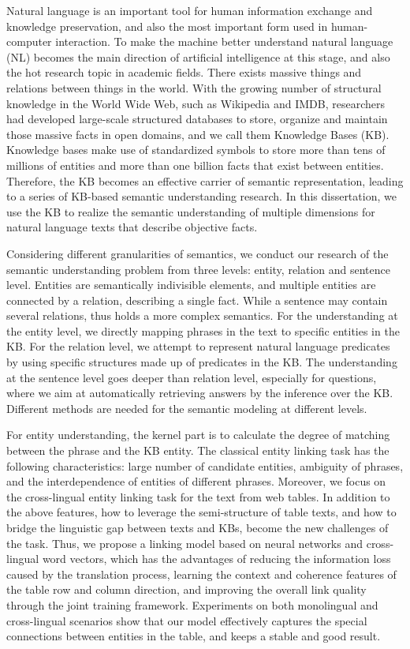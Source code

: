 \begin{englishabstract}

Natural language is an important tool for human information exchange and knowledge preservation,
and also the most important form used in human-computer interaction.
To make the machine better understand natural language (NL) becomes 
the main direction of artificial intelligence at this stage, and also the hot
research topic in academic fields.
There exists massive things and relations between things in the world.
With the growing number of structural knowledge in the World Wide Web,
such as Wikipedia and IMDB, 
researchers had developed large-scale structured databases to store, organize
and maintain those massive facts in open domains, and we call them Knowledge Bases (KB).
Knowledge bases make use of standardized symbols to
store more than tens of millions of entities
and more than one billion facts that exist between entities.
Therefore, the KB becomes an effective carrier of semantic representation,
leading to a series of KB-based semantic understanding research.
In this dissertation, we use the KB to realize the semantic understanding
of multiple dimensions for natural language texts that describe objective facts.

Considering different granularities of semantics, 
we conduct our research of the semantic understanding problem
from three levels: entity, relation and sentence level.
Entities are semantically indivisible elements,
and multiple entities are connected by a relation, describing a single fact.
While a sentence may contain several relations,
thus holds a more complex semantics.
For the understanding at the entity level,
we directly mapping phrases in the text to specific entities in the KB.
For the relation level, we attempt to represent natural language predicates by
using specific structures made up of predicates in the KB.
The understanding at the sentence level goes deeper than relation level,
especially for questions, where we aim at automatically retrieving answers by the inference over the KB.
Different methods are needed for the semantic modeling at different levels.

For entity understanding, the kernel part is to calculate 
the degree of matching between the phrase and the KB entity.
The classical entity linking task has the following characteristics: 
large number of candidate entities, ambiguity of phrases,
and the interdependence of entities of different phrases.
Moreover, we focus on the cross-lingual entity linking task for the text from web tables.
In addition to the above features,
how to leverage the semi-structure of table texts,
and how to bridge the linguistic gap between texts and KBs,
become the new challenges of the task.
Thus, we propose a linking model based on neural networks and cross-lingual word vectors,
which has the advantages of reducing the information loss caused by the translation process,
learning the context and coherence features of the table row and column direction,
and improving the overall link quality through the joint training framework.
Experiments on both monolingual and cross-lingual scenarios show that our model
effectively captures the special connections between entities in the table, 
and keeps a stable and good result.


\end{englishabstract}
